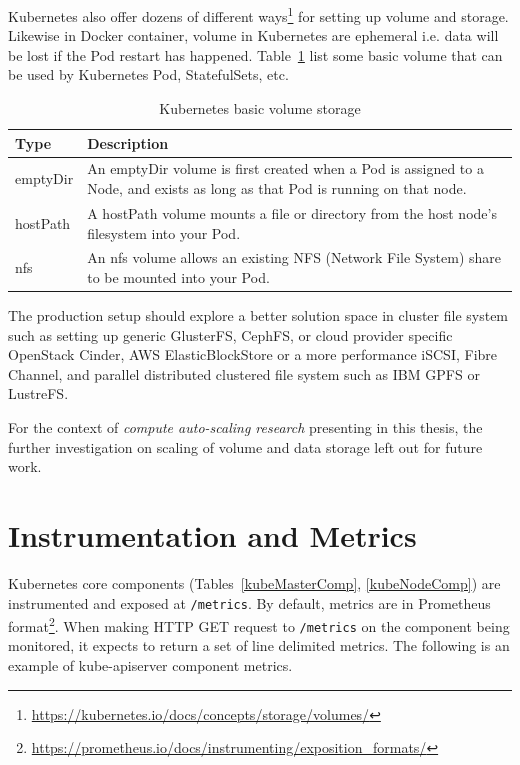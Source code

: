Kubernetes also offer dozens of different ways\footnote{\url{https://kubernetes.io/docs/concepts/storage/volumes/}} for setting up volume and storage. Likewise in Docker container, volume in Kubernetes are ephemeral i.e. data will be lost if the Pod restart has happened. Table~\ref{kubeVol} list some basic volume that can be used by Kubernetes Pod, StatefulSets, etc.

\begin{table}[H]
\centering
    \begin{tabular}{ | l | p{11cm} |}
    \hline
    Type & Description \\ \hline
    emptyDir & An emptyDir volume is first created when a Pod is assigned to a Node, and exists as long as that Pod is running on that node. \\ \hline
    hostPath & A hostPath volume mounts a file or directory from the host node’s filesystem into your Pod. \\  \hline
    nfs & An nfs volume allows an existing NFS (Network File System) share to be mounted into your Pod. \\
    \hline
    \end{tabular}
\caption{Kubernetes basic volume storage}
\label{kubeVol}  
\end{table}

\noindent The production setup should explore a better solution space in cluster file system such as setting up generic GlusterFS, CephFS, or cloud provider specific OpenStack Cinder, AWS ElasticBlockStore or a more performance iSCSI, Fibre Channel, and parallel distributed clustered file system such as IBM GPFS or LustreFS.

For the context of \emph{compute auto-scaling research} presenting in this thesis, the further investigation on scaling of volume and data storage left out for future work.

\section{Instrumentation and Metrics}
\label{metrics}
Kubernetes core components (Tables~\ref{kubeMasterComp}, \ref{kubeNodeComp}) are instrumented and exposed at \verb|/metrics|. By default, metrics are in Prometheus format\footnote{\url{https://prometheus.io/docs/instrumenting/exposition_formats/}}. When making HTTP GET request to \verb|/metrics| on the component being monitored, it expects to return a set of line delimited metrics. The following is an example of kube-apiserver component metrics.

